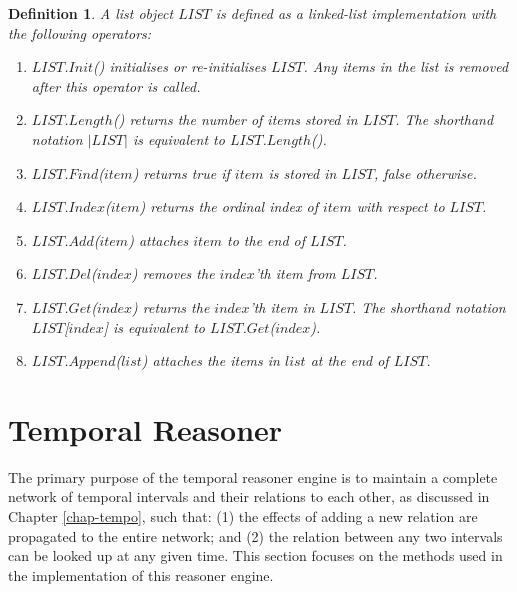 \documentclass[11pt]{report}
\newtheorem{vdefinition}{Definition}[chapter]
\begin{document}
      \begin{vdefinition}
        \label{defn-impln-lists}
        A list object $LIST$ is defined as a linked-list implementation with
        the following operators:

        \begin{enumerate}
          \item
            $LIST$.$Init$() initialises or re-initialises $LIST$. Any items
            in the list is removed after this operator is called.

          \item
            $LIST$.$Length$() returns the number of items stored in $LIST$.
            The shorthand notation $|LIST|$ is equivalent to $LIST$.$Length$().

          \item
            $LIST$.$Find$($item$) returns {\em true} if $item$ is stored in
            $LIST$, {\em false} otherwise.

          \item
            $LIST$.$Index$($item$) returns the ordinal index of $item$ with
            respect to $LIST$.

          \item
            $LIST$.$Add$($item$) attaches $item$ to the end of $LIST$.

          \item
            $LIST$.$Del$($index$) removes the $index$'th item from $LIST$.

          \item
            $LIST$.$Get$($index$) returns the $index$'th item in $LIST$. The
            shorthand notation $LIST$[$index$] is equivalent to
            $LIST$.$Get$($index$).

          \item
            $LIST$.$Append$($list$) attaches the items in $list$ at the end of
            $LIST$.
        \end{enumerate}
      \end{vdefinition}

    \section{Temporal Reasoner}
      \label{sect-impln-treas}

      The primary purpose of the temporal reasoner engine is to maintain a
      complete network of temporal intervals and their relations to each
      other, as discussed in Chapter \ref{chap-tempo}, such that: (1) the
      effects of adding a new relation are propagated to the entire network;
      and (2) the relation between any two intervals can be looked up at any
      given time. This section focuses on the methods used in the
      implementation of this reasoner engine.
\end{document}

